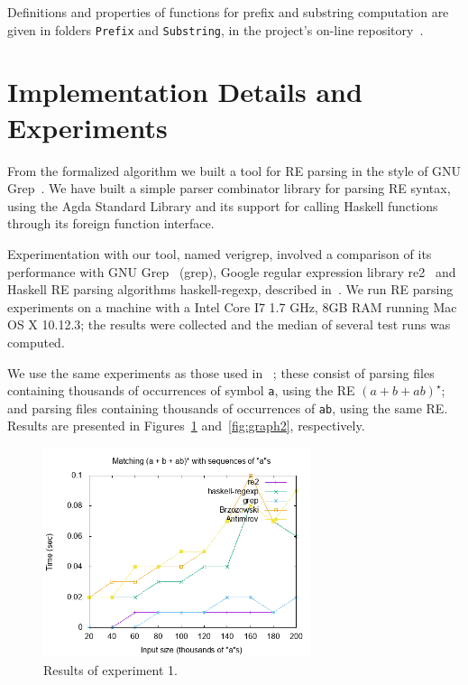 \documentclass[review]{elsarticle}
\begin{document}
Definitions and properties of functions for prefix and substring computation
are given in folders \texttt{Prefix} and \texttt{Substring}, in the project's on-line
repository~\cite{regex-rep}.

\section{Implementation Details and Experiments}\label{sec:exp}

From the formalized algorithm we built a tool for RE parsing in the
style of GNU Grep~\cite{Grep}. We have built a simple parser
combinator library for parsing RE syntax, using the Agda Standard
Library and its support for calling Haskell functions through its
foreign function interface.

Experimentation with our tool, named verigrep, involved a comparison
of its performance with GNU Grep~\cite{Grep} (grep), Google regular
expression library re2~\cite{re2} and Haskell RE parsing algorithms
haskell-regexp, described in~\cite{Fischer2010}. We run RE parsing
experiments on a machine with a Intel Core I7 1.7 GHz, 8GB RAM running
Mac OS X 10.12.3; the results were collected and the median of several
test runs was computed.

We use the same experiments as those used in ~\cite{SulzmannL14};
these consist of parsing files containing thousands of occurrences of
symbol \texttt{a}, using the RE $(a + b + ab)^\star$; and parsing
files containing thousands of occurrences of \texttt{ab}, using the
same RE. Results are presented in Figures~\ref{fig:graph1}
and~\ref{fig:graph2}, respectively.

\begin{figure}[!ht]
    \includegraphics[width=0.7\textwidth]{as.png}
   \centering
   \caption{Results of experiment 1.}
   \label{fig:graph1}
\end{figure}
\end{document}
